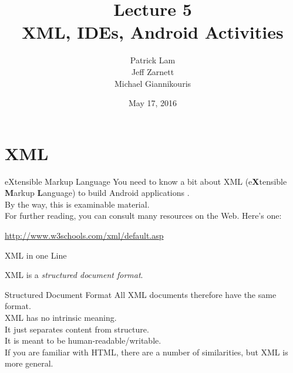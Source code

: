 \documentclass[aspectratio=169]{beamer}
\title{Lecture 5 \\ XML, IDEs, Android Activities}
\date{May 17, 2016}
\author{Patrick Lam \\ Jeff Zarnett \\ Michael Giannikouris}
\institute{Department of Electrical and Computer Engineering}
\begin{document}
\maketitle



\section*{XML}



\begin{frame}{eXtensible Markup Language}
You need to know a bit about
XML (e\textbf{X}tensible \textbf{M}arkup \textbf{L}anguage)  to build Android applications . \\
\vspace{2em}
By the way, this is examinable material. \\
\vspace{2em}
For further reading, you can consult many resources on the Web. Here's one:
\begin{center}
\url{http://www.w3schools.com/xml/default.asp}
\end{center}
\end{frame}



\begin{frame}{XML in one Line}
\begin{center}
{\Large XML is a \emph{structured document format}.}
\end{center}
\end{frame}



\begin{frame}{Structured Document Format}
All XML documents therefore have the same format. \\
\vspace{1em}
XML has no intrinsic meaning. \\ 
\vspace{1em}
It just separates content from structure. \\
\vspace{1em}
It is meant to be human-readable/writable. \\
\vspace{1em}
If you are familiar with HTML, there are a number of similarities, but XML is more general. 
\end{frame}
\end{document}
